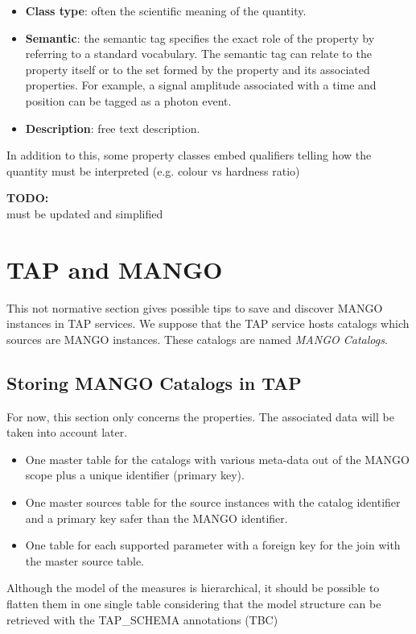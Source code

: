\documentclass[11pt,a4paper]{ivoa}
\newcommand{\TODO}[1]{%
    \noindent%
    \colorbox{todocolor}{%
            \parbox{0.85\linewidth}{\sffamily \textbf{TODO:}\\
            #1}
    }%
    \vspace{2pt}

}
\begin{document}
\begin{itemize}
    \item \textbf{Class type}: often the scientific meaning of the quantity.
    \item \textbf{Semantic}: the semantic tag specifies the exact role of the property by
          referring to a standard vocabulary. The semantic tag can relate to the property itself
          or to the set formed by the property and its associated properties.
          For example, a signal amplitude associated with a time and position can be tagged
          as a photon event.
    \item \textbf{Description}: free text description.
\end{itemize}


In addition to this, some property classes embed qualifiers telling how the quantity
must be interpreted (e.g. colour vs hardness ratio)



\TODO{must be updated and simplified}

\section{TAP and MANGO}
This not normative section gives possible tips to save and discover MANGO instances in TAP services.
We suppose that the TAP service hosts catalogs which sources are MANGO instances.
These catalogs are named \emph{MANGO Catalogs}.

\subsection{Storing MANGO Catalogs in TAP}
For now, this section only concerns the properties. The associated data will be taken into account later.

\begin{itemize}
  \item One master table for the catalogs with various meta-data out of the MANGO scope plus a 
        unique identifier (primary key).
  \item One master sources table for the source instances with the catalog identifier and a
        primary key safer than the MANGO identifier.
  \item One table for each supported parameter with a foreign key for the join with the
        master source table.
\end{itemize}

Although the model of the measures is hierarchical, it should be possible to flatten them in
one single table considering that the model structure can be retrieved with the TAP\_SCHEMA annotations
(TBC)
\end{document}
